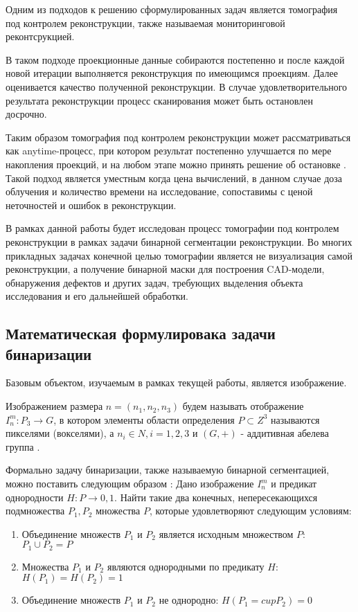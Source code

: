 Одним из подходов к решению сформулированных задач является томография под контролем реконструкции, также называемая мониторинговой реконтсрукцией. 

В таком подходе проекционные данные собираются постепенно и после каждой новой итерации выполняется реконструкция по имеющимся проекциям. Далее оценивается качество полученной реконструкции. В случае удовлетворительного результата реконструкции процесс сканирования может быть остановлен досрочно. 

Таким образом томография под контролем реконструкции может рассматриваться как anytime-процесс, при котором результат постепенно улучшается по мере накопления проекций, и на любом этапе можно принять решение об остановке \cite{bulatov2020monitored}. Такой подход является уместным когда цена вычислений, в данном случае доза облучения и количество времени на исследование, сопоставимы с ценой неточностей и ошибок в реконструкции.

В рамках данной работы будет исследован процесс томографии под контролем реконструкции в рамках задачи бинарной сегментации реконструкции. Во многих прикладных задачах конечной целью томографии является не визуализация самой реконструкции, а получение бинарной маски для построения CAD-модели, обнаружения дефектов и других задач, требующих выделения объекта исследования и его дальнейшей обработки.

\subsection{Математическая формулировака задачи бинаризации}

Базовым объектом, изучаемым в рамках текущей работы, является изображение.

Изображением размера \(n=(n_1, n_2, n_3)\) будем называть отображение \(I_n^m : P_3 \rightarrow G\), в котором элементы области определения \(P \subset Z^3\)  называются пикселями (вокселями), а \(n_i \in N, i = 1, 2, 3\) и \((G, +)\) - аддитивная абелева группа \cite{NikolaevPhdthesis}.

Формально задачу бинаризации, также называемую бинарной сегментацией, можно поставить следующим образом \cite{fu1981survey}:
Дано изображение \( I_n^m \) и предикат однородности \(H : P \rightarrow {0, 1}\). Найти такие два конечных, непересекающихся подмножества \( P_1, P_2\) множества \(P\), которые удовлетворяют следующим условиям: 
\begin{enumerate}
    \item Объединение множеств \(P_1\) и \(P_2\) является исходным множеством \(P\): \( P_1 \cup  P_2 = P \) 
    \item Множества \(P_1\) и \(P_2\) являются однородными по предикату \(H\): \(H(P_1) = H(P_2) = 1\)
    \item Объединение множеств \(P_1\) и \(P_2\) не однородно: \(H(P_1 =cup P_2) = 0\)
\end{enumerate}

